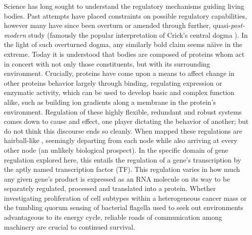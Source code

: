 Science has long sought to understand the regulatory mechanisms guiding living bodies. Past attempts have placed constraints on possible regulatory capabilities, however many have since been overturn or amended through further, quasi-\emph{post-modern} study (famously the popular interpretation of Crick's central dogma \cite{crick1958protein}). In the light of such overturned dogma, any similarly bold claim seems n\"{a}ive in the extreme. Today it is understood that bodies are composed of proteins whom act in concert with not only those constituents, but with its surrounding environment. Crucially, proteins have come upon a means to affect change in other proteins behavior largely through binding, \eg regulating expression or enzymatic activity, which can be used to develop basic and complex function alike, such as building ion gradients along a membrane in the protein's environment. Regulation of these highly flexible, redundant and robust systems comes down to cause and effect, \ie one player dictating the behavior of another; but do not think this discourse ends so cleanly. When mapped these regulations are hairball-like \cite{schulz2013grooming}, seemingly departing from each node while also arriving at every other node (an unlikely biological prospect). In the specific domain of gene regulation explored here, this entails the regulation of a gene's transcription by the aptly named transcription factor (TF). This regulation varies in how much any given gene's product is expressed as an RNA molecule on its way to be separately regulated, processed and translated into a protein. Whether investigating proliferation of cell subtypes within a heterogeneous cancer mass or the tumbling quorum sensing of bacterial flagella used to seek out environments advantageous to its energy cycle, reliable roads of communication among machinery are crucial to continued survival.

